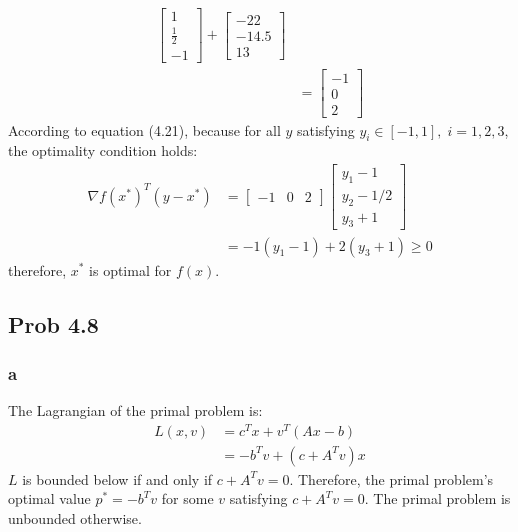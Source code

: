 \documentclass[10pt,a4paper]{article}
\begin{document}
\begin{align*}
                             \begin{bmatrix}
                               1\\
                               \frac{1}{2}\\
                               -1
                             \end{bmatrix} +
  \begin{bmatrix}
    -22\\
    -14.5\\
    13
  \end{bmatrix}\\
                &=
                  \begin{bmatrix}
                    -1\\
                    0\\
                    2
                  \end{bmatrix}
\end{align*}
According to equation (4.21)\cite{boyd2004convex}, because for all
$y$ satisfying $y_i \in [-1,1], \; i=1,2,3$, the optimality
condition holds:
\begin{align*}
 \nabla f(x^*)^T(y-x^*)&=\begin{bmatrix}
-1 & 0 & 2
\end{bmatrix}
\begin{bmatrix}
  y_1 - 1\\
  y_2 - 1/2\\
  y_3 + 1
\end{bmatrix}\\
&=
-1(y_1-1)+2(y_3+1)\geq0
\end{align*}
therefore, $x^*$ is optimal for $f(x)$.


\subsection{Prob 4.8}

\subsubsection{a}
The Lagrangian of the primal problem is:
\begin{align*}
  L(x,v) &= c^Tx + v^T(Ax-b)\\
         &= -b^Tv+(c+A^Tv)x
\end{align*}
$L$ is bounded below if and only if $c+A^Tv=0$. Therefore, the
primal problem's optimal value $p^*=-b^Tv$ for some $v$
satisfying $c+A^Tv=0$. The primal problem is unbounded otherwise.
\end{document}
